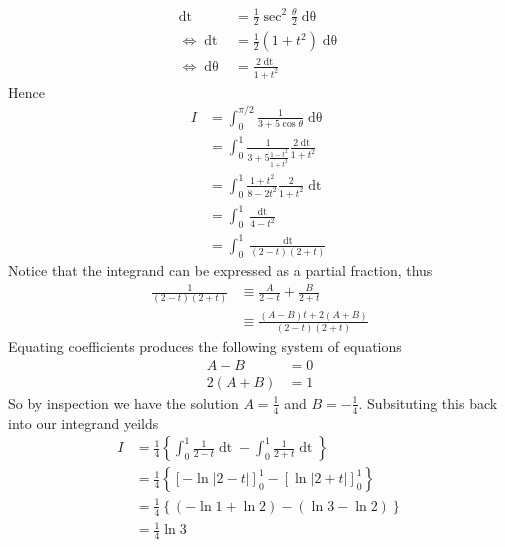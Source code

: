 \documentclass[12pt,oneside]{book}
\begin{document}
\begin{enumerate}
\begin{enumerate}
\begin{align*}
                \mathop{\mathrm{d}t} &= \frac{1}{2} \sec^2 \frac{\theta}{2} \mathop{\mathrm{d}\theta} \\
                \iff \mathop{\mathrm{d}t} &= \frac{1}{2} (1 + t^2) \mathop{\mathrm{d}\theta} \\
                \iff \mathop{\mathrm{d}\theta} &= \frac{2 \mathop{\mathrm{d}t}}{1 + t^2}
            \end{align*} Hence \begin{align*}
                I &= \int_{0}^{\pi/2} \frac{1}{3+5\cos \theta} \mathop{\mathrm{d}\theta} \\
                &= \int_{0}^{1} \frac{1}{3+5 \frac{1 - t^2}{1 + t^2}} \frac{2 \mathop{\mathrm{d}t} }{1 + t^2} \\
                &= \int_{0}^{1} \frac{1 + t^2}{8 - 2t^2} \frac{2}{1 + t^2} \mathop{\mathrm{d}t} \\
                &= \int_{0}^{1} \frac{\mathop{\mathrm{d}t} }{4-t^2}\\
                &= \int_{0}^{1} \frac{\mathop{\mathrm{d}t}}{(2 - t)(2 + t)}     
            \end{align*}
            Notice that the integrand can be expressed as a partial fraction, thus \begin{align*}
                \frac{1}{(2-t)(2+t)} &\equiv \frac{A}{2-t} + \frac{B}{2+t} \\
                &\equiv \frac{(A - B) t + 2(A + B)}{(2-t)(2+t)}
            \end{align*}
            Equating coefficients produces the following system of equations \begin{align*}
                A - B &= 0 \\
                2 (A + B) &= 1
            \end{align*}
            So by inspection we have the solution $A = \frac{1}{4}$ and $B = - \frac{1}{4}$. Subsituting this back into our integrand yeilds \begin{align*}
                I &= \frac{1}{4} \left\{ \int_{0}^{1} \frac{1}{2 - t} \mathop{\mathrm{d}t} - \int_{0}^{1} \frac{1}{2 + t} \mathop{\mathrm{d}t} \right\}  \\
                &= \frac{1}{4} \left\{ \left[  - \ln | 2 - t | \right]_0^1 - \left[ \ln \left| 2 + t \right| \right]_0^1 \right\} \\
                &= \frac{1}{4} \left\{ \left( - \ln 1 + \ln 2 \right) - \left( \ln 3 - \ln 2 \right) \right\} \\
                &= \frac{1}{4} \ln 3

\end{align*}
\end{enumerate}
\end{enumerate}
\end{document}
